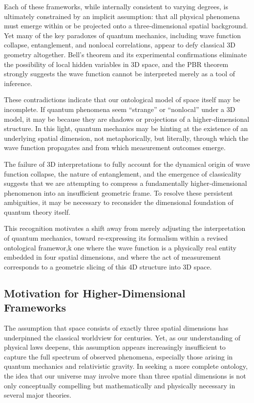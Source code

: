 \documentclass[12pt]{article}
\begin{document}
Each of these frameworks, while internally consistent to varying degrees, is ultimately constrained by an implicit assumption: that all physical phenomena must emerge within or be projected onto a three-dimensional spatial background. Yet many of the key paradoxes of quantum mechanics, including wave function collapse, entanglement, and nonlocal correlations, appear to defy classical 3D geometry altogether. Bell's theorem and its experimental confirmations eliminate the possibility of local hidden variables in 3D space, and the PBR theorem strongly suggests the wave function cannot be interpreted merely as a tool of inference.

These contradictions indicate that our ontological model of space itself may be incomplete. If quantum phenomena seem “strange” or “nonlocal” under a 3D model, it may be because they are shadows or projections of a higher-dimensional structure. In this light, quantum mechanics may be hinting at the existence of an underlying spatial dimension, not metaphorically, but literally, through which the wave function propagates and from which measurement outcomes emerge.

The failure of 3D interpretations to fully account for the dynamical origin of wave function collapse, the nature of entanglement, and the emergence of classicality suggests that we are attempting to compress a fundamentally higher-dimensional phenomenon into an insufficient geometric frame. To resolve these persistent ambiguities, it may be necessary to reconsider the dimensional foundation of quantum theory itself.

This recognition motivates a shift away from merely adjusting the interpretation of quantum mechanics, toward re-expressing its formalism within a revised ontological framewor,k one where the wave function is a physically real entity embedded in four spatial dimensions, and where the act of measurement corresponds to a geometric slicing of this 4D structure into 3D space.


\subsection{Motivation for Higher-Dimensional Frameworks}

The assumption that space consists of exactly three spatial dimensions has underpinned the classical worldview for centuries. Yet, as our understanding of physical laws deepens, this assumption appears increasingly insufficient to capture the full spectrum of observed phenomena, especially those arising in quantum mechanics and relativistic gravity. In seeking a more complete ontology, the idea that our universe may involve more than three spatial dimensions is not only conceptually compelling but mathematically and physically necessary in several major theories.
\end{document}
